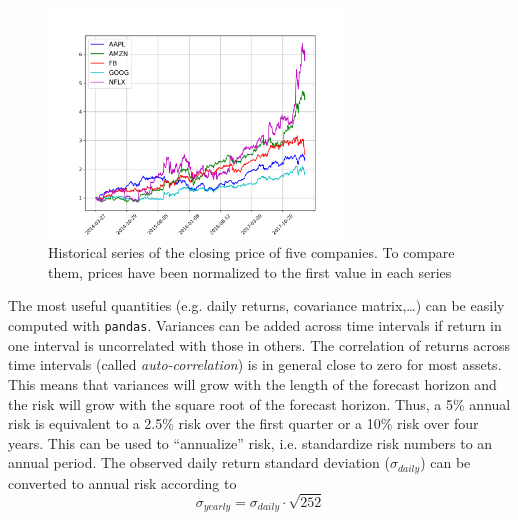 \begin{figure}[htbp]
\centering
\includegraphics[width=0.7\textwidth]{figures/portfolio_sample}
\caption{Historical series of the closing price of five companies. To compare them, prices have been normalized to the first value in each series}
\label{fig:stocks}
\end{figure}

The most useful quantities (e.g. daily returns, covariance matrix,\ldots) can be easily computed with \texttt{pandas}.
Variances can be added across time intervals if return in one interval is uncorrelated with those in others. The correlation of returns across time intervals (called \emph{auto-correlation}) is in general close to zero for most assets. This means that variances will grow with the length of the forecast horizon and the risk will grow with the square root of the forecast horizon. Thus, a 5\% annual risk is equivalent to a 2.5\% risk over the first quarter or a 10\% risk over four years. 
This can be used to “annualize” risk, i.e. standardize risk numbers to an annual period. The observed daily return standard deviation ($\sigma_{daily}$) can be converted to annual risk according to
\begin{equation}
\sigma_{yearly} = \sigma_{daily}\cdot\sqrt{252}
\end{equation}

%
%

